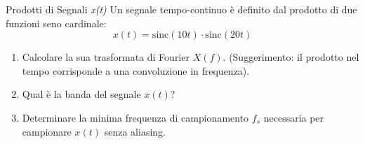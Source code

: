 
\begin{esercizio}{Prodotti di Segnali \textit{x(t)}}
    Un segnale tempo-continuo è definito dal prodotto di due funzioni seno cardinale:
    \[
        x(t) = \text{sinc}(10t) \cdot \text{sinc}(20t)
    \]
    \begin{enumerate}
        \item Calcolare la sua trasformata di Fourier $X(f)$.
        (Suggerimento: il prodotto nel tempo corrisponde a una convoluzione in frequenza).
        \item Qual è la banda del segnale $x(t)$?
        \item Determinare la minima frequenza di campionamento $f_s$ necessaria per campionare $x(t)$ senza aliasing.
    \end{enumerate}
\end{esercizio}